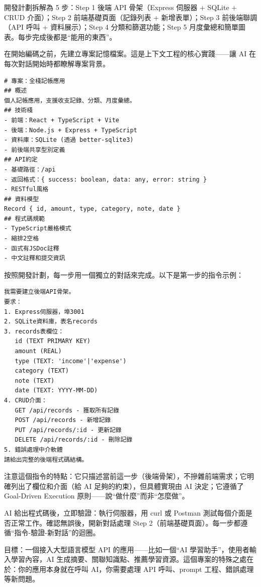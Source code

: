 開發計劃拆解為 5 步：Step 1 後端 API 骨架（Express 伺服器 + SQLite + CRUD 介面）；Step 2 前端基礎頁面（記錄列表 + 新增表單）；Step 3 前後端聯調（API 呼叫 + 資料展示）；Step 4 分類和篩選功能；Step 5 月度彙總和簡單圖表。每步完成後都是“能用的東西”。


在開始編碼之前，先建立專案記憶檔案。這是上下文工程的核心實踐——讓 AI 在每次對話開始時都瞭解專案背景。

\begin{lstlisting}
# 專案：全棧記帳應用
## 概述
個人記帳應用，支援收支記錄、分類、月度彙總。
## 技術棧
- 前端：React + TypeScript + Vite
- 後端：Node.js + Express + TypeScript
- 資料庫：SQLite (透過 better-sqlite3)
- 前後端共享型別定義
## API約定
- 基礎路徑：/api
- 返回格式：{ success: boolean, data: any, error: string }
- RESTful風格
## 資料模型
Record { id, amount, type, category, note, date }
## 程式碼規範
- TypeScript嚴格模式
- 縮排2空格
- 函式有JSDoc註釋
- 中文註釋和提交資訊
\end{lstlisting}


按照開發計劃，每一步用一個獨立的對話來完成。以下是第一步的指令示例：

\begin{lstlisting}
我需要建立後端API骨架。
要求：
1. Express伺服器，埠3001
2. SQLite資料庫，表名records
3. records表欄位：
   id (TEXT PRIMARY KEY)
   amount (REAL)
   type (TEXT: 'income'|'expense')
   category (TEXT)
   note (TEXT)
   date (TEXT: YYYY-MM-DD)
4. CRUD介面：
   GET /api/records - 獲取所有記錄
   POST /api/records - 新增記錄
   PUT /api/records/:id - 更新記錄
   DELETE /api/records/:id - 刪除記錄
5. 錯誤處理中介軟體
請給出完整的後端程式碼結構。
\end{lstlisting}

注意這個指令的特點：它只描述當前這一步（後端骨架），不摻雜前端需求；它明確列出了欄位和介面（給 AI 足夠的約束），但具體實現由 AI 決定；它遵循了 Goal-Driven Execution 原則——說“做什麼”而非“怎麼做”。

AI 給出程式碼後，立即驗證：執行伺服器，用 curl 或 Postman 測試每個介面是否正常工作。確認無誤後，開新對話處理 Step 2（前端基礎頁面）。每一步都遵循“指令-驗證-新對話”的迴圈。



目標：一個接入大型語言模型 API 的應用——比如一個“AI 學習助手”，使用者輸入學習內容，AI 生成摘要、關聯知識點、推薦學習資源。這個專案的特殊之處在於：你的應用本身就在呼叫 AI，你需要處理 API 呼叫、prompt 工程、錯誤處理等新問題。

